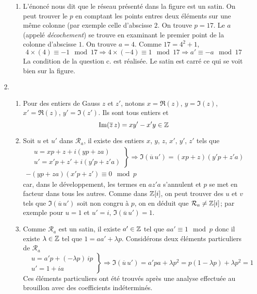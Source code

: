 \begin{enumerate}
\begin{enumerate}
  \item L'énoncé nous dit que le réseau présenté dans la figure est un satin. On peut trouver le $p$ en comptant les points entres deux éléments sur une même colonne (par exemple celle d'abscisse $2$. On trouve $p=17$. Le $a$ (appelé \emph{décochement}) se trouve en examinant le premier point de la colonne d'abscisse $1$. On trouve $a=4$.\newline
  Comme $17 = 4^2 + 1$, 
\begin{displaymath}
  4\times(4)\equiv -1 \mod 17 \Rightarrow 4\times(-4)\equiv 1 \mod 17 \Rightarrow a' \equiv -a \mod 17 
\end{displaymath}
La condition de la question c. est  réalisée. Le satin est carré ce qui se voit bien sur la figure.
\end{enumerate}

\item
\begin{enumerate}
  \item Pour des entiers de Gauss $z$ et $z'$, notons $x=\Re(z)$, $y=\Im(z)$, $x'=\Re(z)$, $y'=\Im(z')$. Ils sont tous entiers et
\begin{displaymath}
  \operatorname{Im}(\overline{z}\,z) = xy' - x'y \in \mathbb{Z}
\end{displaymath}

  \item Soit $u$ et $u'$ dans $\mathcal{R}_a$, il existe des entiers $x$, $y$, $z$, $x'$, $y'$, $z'$ tels que
\begin{multline*}
\left. 
\begin{aligned}
&u = xp+z + i(yp +za)\\ &u' = x'p+z' + i(y'p +z'a)  
\end{aligned}
\right\rbrace 
\Rightarrow
\Im(\overline{u}\, u') = (xp+z)(y'p+z'a) \\- (yp+za)(x'p+z')
\equiv 0 \mod p
\end{multline*}
car, dans le développement, les termes en $az'a$ s'annulent et $p$ se met en facteur dans tous les autres.\newline
Comme dans $\mathbb{Z}[i]$, on peut trouver des $u$ et $v$ tels que $\Im(\overline{u}\,u')$ soit non congru à $p$, on en déduit que $\mathcal{R}_a \neq \mathbb{Z}[i]$; par exemple pour $u=1$ et $u'=i$, $\Im(\overline{u}\,u')=1$.
  \item Comme $\mathcal{R}_a$ est un satin, il existe $a'\in \mathbb{Z}$ tel que $aa' \equiv 1 \mod p$ donc il existe $\lambda\in \mathbb{Z}$ tel que $1=aa' + \lambda p$. Considérons deux éléments particuliers de $\mathcal{R}_a$ 
\begin{displaymath}
\left. 
\begin{aligned}
&u = a'p +(- \lambda p)\, ip\\ &u' = 1 + ia  
\end{aligned}
\right\rbrace 
\Rightarrow
\Im(\overline{u}\,u') = a'pa +\lambda p^2 = p(1-\lambda p) +\lambda p^2 = 1
\end{displaymath}
Ces éléments particuliers ont été trouvés après une analyse effectuée au brouillon avec des coefficients indéterminés.
\end{enumerate}


\end{enumerate}
